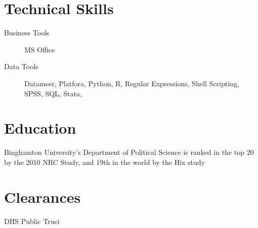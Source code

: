 \documentclass[10pt,a4paper]{moderncv}
\begin{document}
\section{Technical Skills}
{\begin{description}      
\item[Business Tools] MS Office
\item[Data Tools] Datameer, Platfora, Python, R, Regular Expressions,
  Shell Scripting, SPSS, SQL, Stata, 
\end{description}}

         
\section{Education}
         {}{}{Binghamton University’s Department of
           Political Science is ranked in the top 20 by the
           2010 NRC Study, and 19th in the world by the Hix study}
         
         {}{}{}


\section{Clearances}
DHS Public Trust
         
\end{document}
